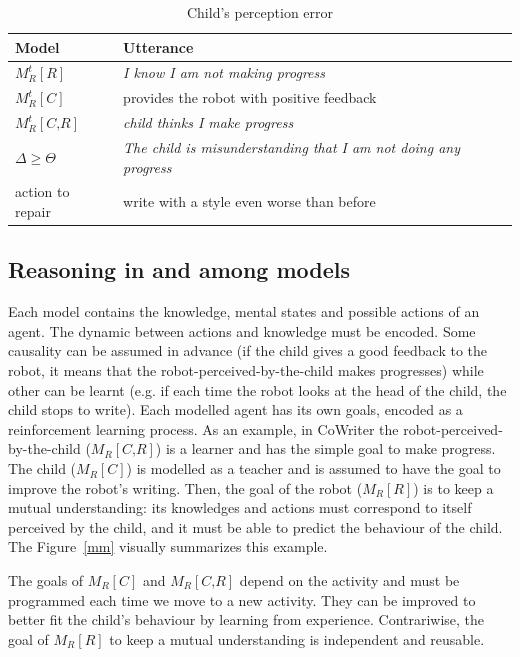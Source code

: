 \documentclass[10pt,a4paper]{article}
\begin{document}
\begin{table}
\centering
\renewcommand{\arraystretch}{1.5}
\begin{tabular}{|l|l|}
\hline
\textbf{Model} & \textbf{Utterance}\\
\hline
$M^t_R\left[\textit{R}\right]$ & \textit{I know I am not making progress}\\
\hline
$M^{t}_R\left[\textit{C}\right]$ & provides the robot with positive feedback\\
\hline
$M^{t}_R\left[\textit{C,R}\right]$ & \textit{child thinks I make progress}\\
\hline
$\Delta \geq \Theta$ & \textit{The child is misunderstanding that I am not doing any progress}\\
\hline
action to repair & write with a style even worse than before\\
\hline
\end{tabular}
\caption{Child's perception error}
\label{child_err}
\end{table}

\subsection{Reasoning in and among models}
Each model contains the knowledge, mental states and possible actions of an agent. The dynamic between actions and knowledge must be encoded. Some causality can be assumed in advance (if the child gives a good feedback to the robot, it means that the robot-perceived-by-the-child makes progresses) while other can be learnt (e.g. if each time the robot looks at the head of the child, the child stops to write). Each modelled agent has its own goals, encoded as a reinforcement learning process. As an example, in CoWriter the robot-perceived-by-the-child ($ M_R\left[\textit{C,R}\right]$) is a learner and has the simple goal to make progress. The child ($ M_R\left[\textit{C}\right]$) is modelled as a teacher and is assumed to have the goal to improve the robot's writing. Then, the goal of the robot ($ M_R\left[\textit{R}\right]$) is to keep a mutual understanding: its knowledges and actions must correspond to itself perceived by the child, and it must be able to predict the behaviour of the child. The Figure~\ref{mm} visually summarizes this example.

The goals of $ M_R\left[\textit{C}\right]$ and $ M_R\left[\textit{C,R}\right]$ depend on the activity and must be programmed each time we move to a new activity. They can be improved to better fit the child's behaviour by learning from experience. Contrariwise, the goal of $ M_R\left[\textit{R}\right]$ to keep a mutual understanding is independent and reusable. 
\end{document}
